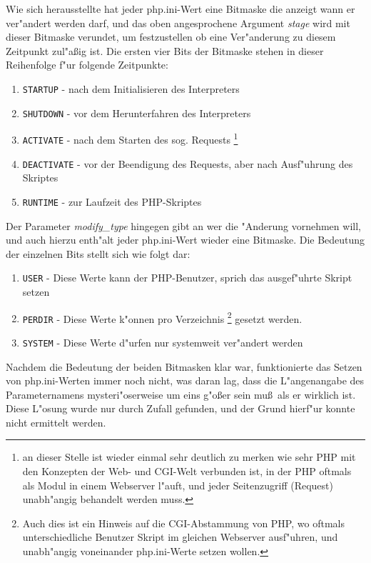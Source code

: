 Wie sich herausstellte hat jeder php.ini-Wert eine Bitmaske die anzeigt wann er ver"andert werden darf, und das oben angesprochene Argument
\emph{stage} wird mit dieser Bitmaske verundet, um festzustellen ob eine Ver"anderung zu diesem Zeitpunkt zul"a\ss ig ist.
Die ersten vier Bits der Bitmaske stehen in dieser Reihenfolge f"ur folgende Zeitpunkte: 
\begin{enumerate}
\item \texttt{STARTUP} - nach dem Initialisieren des Interpreters
\item \texttt{SHUTDOWN} - vor dem Herunterfahren des Interpreters
\item \texttt{ACTIVATE} - nach dem Starten des sog. Requests 
      \footnote{an dieser Stelle ist wieder einmal sehr deutlich zu merken wie sehr PHP mit den Konzepten der Web- und CGI-Welt verbunden ist, in der
      PHP oftmals als Modul in einem Webserver l"auft, und jeder Seitenzugriff (Request) unabh"angig behandelt werden muss.}
\item \texttt{DEACTIVATE} - vor der Beendigung des Requests, aber nach Ausf"uhrung des Skriptes
\item \texttt{RUNTIME} - zur Laufzeit des PHP-Skriptes
\end{enumerate}
Der Parameter \emph{modify\_type} hingegen gibt an wer die "Anderung vornehmen will, und auch hierzu enth"alt jeder php.ini-Wert wieder eine Bitmaske.
Die Bedeutung der einzelnen Bits stellt sich wie folgt dar:
\begin{enumerate}
\item \texttt{USER} - Diese Werte kann der PHP-Benutzer, sprich das ausgef"uhrte Skript setzen
\item \texttt{PERDIR} - Diese Werte k"onnen pro Verzeichnis  
      \footnote{Auch dies ist ein Hinweis auf die CGI-Abstammung von PHP, wo oftmals unterschiedliche Benutzer Skript im gleichen Webserver ausf"uhren,
      und unabh"angig voneinander php.ini-Werte setzen wollen.}
      gesetzt werden.
\item \texttt{SYSTEM} - Diese Werte d"urfen nur systemweit ver"andert werden
\end{enumerate}
Nachdem die Bedeutung der beiden Bitmasken klar war, funktionierte das Setzen von php.ini-Werten immer noch nicht, was daran lag, dass die L"angenangabe
des Parameternamens mysteri"oserweise um eins g"o\ss er sein mu\ss\ als er wirklich ist. Diese L"osung wurde nur durch Zufall gefunden, und der
Grund hierf"ur konnte nicht ermittelt werden.


